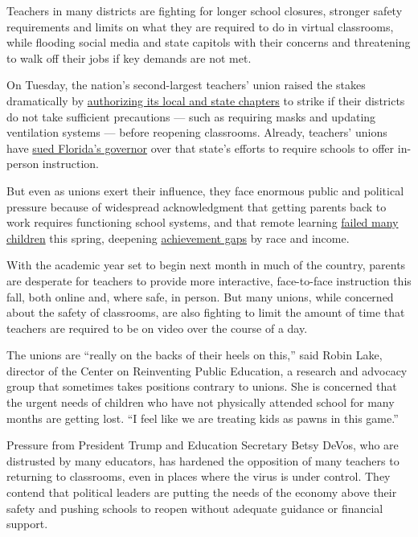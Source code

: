 Teachers in many districts are fighting for longer school closures,
stronger safety requirements and limits on what they are required to do
in virtual classrooms, while flooding social media and state capitols
with their concerns and threatening to walk off their jobs if key
demands are not met.

On Tuesday, the nation's second-largest teachers' union raised the
stakes dramatically by
\href{https://www.nytimes.com/2020/07/28/world/coronavirus-covid-19.html\#link-541bdc40}{authorizing
its local and state chapters} to strike if their districts do not take
sufficient precautions --- such as requiring masks and updating
ventilation systems --- before reopening classrooms. Already, teachers'
unions have
\href{https://www.nytimes.com/2020/07/20/world/coronavirus-cases.html\#link-2e69dc1c}{sued
Florida's governor} over that state's efforts to require schools to
offer in-person instruction.

But even as unions exert their influence, they face enormous public and
political pressure because of widespread acknowledgment that getting
parents back to work requires functioning school systems, and that
remote learning
\href{https://www.nytimes.com/2020/06/05/us/coronavirus-education-lost-learning.html}{failed
many children} this spring, deepening
\href{https://www.nytimes.com/2020/06/05/us/coronavirus-education-lost-learning.html}{achievement
gaps} by race and income.

With the academic year set to begin next month in much of the country,
parents are desperate for teachers to provide more interactive,
face-to-face instruction this fall, both online and, where safe, in
person. But many unions, while concerned about the safety of classrooms,
are also fighting to limit the amount of time that teachers are required
to be on video over the course of a day.

The unions are ``really on the backs of their heels on this,'' said
Robin Lake, director of the Center on Reinventing Public Education, a
research and advocacy group that sometimes takes positions contrary to
unions. She is concerned that the urgent needs of children who have not
physically attended school for many months are getting lost. ``I feel
like we are treating kids as pawns in this game.''

Pressure from President Trump and Education Secretary Betsy DeVos, who
are distrusted by many educators, has hardened the opposition of many
teachers to returning to classrooms, even in places where the virus is
under control. They contend that political leaders are putting the needs
of the economy above their safety and pushing schools to reopen without
adequate guidance or financial support.

